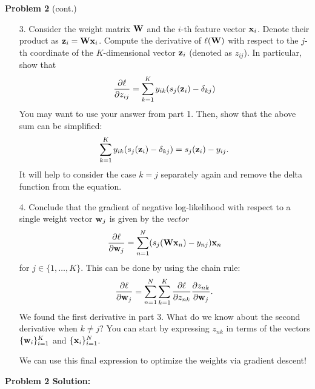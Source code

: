 \documentclass[submit]{harvardml}
\begin{document}
\begin{framed}
\noindent\textbf{Problem 2} (cont.)\\
\begin{enumerate}
    \item[3.] Consider the weight matrix $\mathbf{W}$ and the $i$-th feature vector $\mathbf{x}_i$. Denote their product as $\mathbf{z}_i = \mathbf{W}\mathbf{x}_i$. Compute the derivative of $\ell(\mathbf{W})$ with respect to the $j$-th coordinate of the $K$-dimensional vector $\mathbf{z}_i$ (denoted as $z_{ij}$). In particular, show that 
    $$
    \frac{\partial \ell}{\partial z_{ij}} = \sum_{k = 1}^K y_{ik}(s_j(\mathbf{z}_i) - \delta_{kj})
    $$
    You may want to use your answer from part 1. Then, show that the above sum can be simplified:
    $$
    \sum_{k = 1}^K y_{ik}(s_j(\mathbf{z}_i) - \delta_{kj}) = s_j(\mathbf{z}_i) - y_{ij}.
    $$
    It will help to consider the case $k = j$ separately again and remove the delta function from the equation.
    \item[4.] Conclude that the gradient of negative log-likelihood with respect to a single weight vector $\mathbf{w}_j$ is given by the \textit{vector}
    $$
    \frac{\partial \ell}{\partial \mathbf{w}_j} = \sum_{n = 1}^N(s_j(\mathbf{W}\mathbf{x}_n) - y_{nj})\mathbf{x}_n
    $$
    for $j \in \{1, \dots, K\}$. This can be done by using the chain rule:
    $$
    \frac{\partial \ell}{\partial \mathbf{w}_j} = \sum_{n = 1}^N\sum_{k = 1}^K\frac{\partial \ell}{\partial z_{nk}}\frac{\partial z_{nk}}{\partial \mathbf{w}_j}.
    $$
    We found the first derivative in part 3. What do we know about the second derivative when $k \neq j$? You can start by expressing $z_{nk}$ in terms of the vectors $\{\mathbf{w}_i\}_{i=1}^K$ and $\{\mathbf{x}_i\}_{i=1}^N$.
    
    We can use this final expression to optimize the weights via gradient descent!
\end{enumerate}
\end{framed}
\pagebreak
\textbf{Problem 2 Solution:}\\
\end{document}
